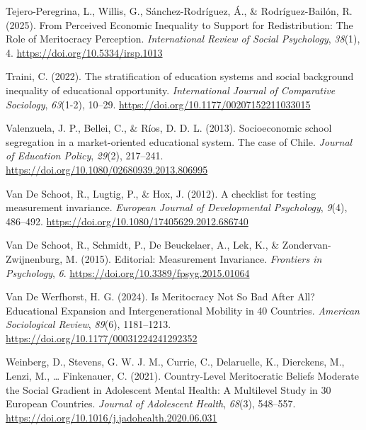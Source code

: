 \documentclass[
  13pt,
]{article}
\newlength{\cslhangindent}
\newenvironment{CSLReferences}[2] %
 {\begin{list}{}{%
  \setlength{\itemindent}{0pt}
  \setlength{\leftmargin}{0pt}
  \setlength{\parsep}{0pt}
  \ifodd #1
   \setlength{\leftmargin}{\cslhangindent}
   \setlength{\itemindent}{-1\cslhangindent}
  \fi
  \setlength{\itemsep}{#2\baselineskip}}}
 {\end{list}}
\begin{document}
\begin{CSLReferences}{1}{0}
Tejero-Peregrina, L., Willis, G., Sánchez-Rodríguez, Á., \&
Rodríguez-Bailón, R. (2025). From {Perceived Economic Inequality} to
{Support} for {Redistribution}: {The Role} of {Meritocracy Perception}.
\emph{International Review of Social Psychology}, \emph{38}(1), 4.
\url{https://doi.org/10.5334/irsp.1013}

Traini, C. (2022). The stratification of education systems and social
background inequality of educational opportunity. \emph{International
Journal of Comparative Sociology}, \emph{63}(1-2), 10--29.
\url{https://doi.org/10.1177/00207152211033015}

Valenzuela, J. P., Bellei, C., \& Ríos, D. D. L. (2013). Socioeconomic
school segregation in a market-oriented educational system. {The} case
of {Chile}. \emph{Journal of Education Policy}, \emph{29}(2), 217--241.
\url{https://doi.org/10.1080/02680939.2013.806995}

Van De Schoot, R., Lugtig, P., \& Hox, J. (2012). A checklist for
testing measurement invariance. \emph{European Journal of Developmental
Psychology}, \emph{9}(4), 486--492.
\url{https://doi.org/10.1080/17405629.2012.686740}

Van De Schoot, R., Schmidt, P., De Beuckelaer, A., Lek, K., \&
Zondervan-Zwijnenburg, M. (2015). Editorial: {Measurement Invariance}.
\emph{Frontiers in Psychology}, \emph{6}.
\url{https://doi.org/10.3389/fpsyg.2015.01064}

Van De Werfhorst, H. G. (2024). Is {Meritocracy Not So Bad After All}?
{Educational Expansion} and {Intergenerational Mobility} in 40
{Countries}. \emph{American Sociological Review}, \emph{89}(6),
1181--1213. \url{https://doi.org/10.1177/00031224241292352}

Weinberg, D., Stevens, G. W. J. M., Currie, C., Delaruelle, K.,
Dierckens, M., Lenzi, M., \ldots{} Finkenauer, C. (2021). Country-{Level
Meritocratic Beliefs Moderate} the {Social Gradient} in {Adolescent
Mental Health}: {A Multilevel Study} in 30 {European Countries}.
\emph{Journal of Adolescent Health}, \emph{68}(3), 548--557.
\url{https://doi.org/10.1016/j.jadohealth.2020.06.031}


\end{CSLReferences}
\end{document}
